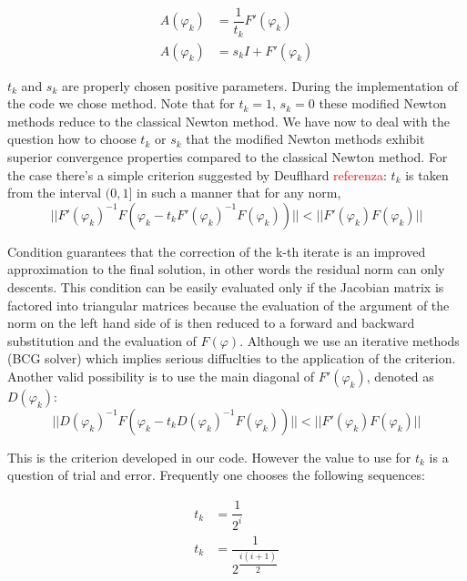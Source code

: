 \begin{align}
A(\varphi_k)&=\dfrac{1}{t_k}F'(\varphi_k) \label{eq: NLP mod used} \\
A(\varphi_k)&=s_kI+F'(\varphi_k) \label{eq: NLP mod not used}
\end{align}

$t_k$ and $s_k$ are properly chosen positive parameters. During the implementation of the code we chose  method. Note that for $t_k=1$, $s_k=0$ these modified Newton methods reduce to the classical Newton method. We have now to deal with the question how to choose $t_k$ or $s_k$ that the modified Newton methods exhibit superior convergence properties compared to the classical Newton method.
For the case  there's a simple criterion suggested by Deuflhard \textcolor{red}{referenza}: $t_k$ is taken from the interval $(0,1]$ in such a manner that for any norm,
\begin{equation}
\label{eq: extended criterion}
||F'(\varphi_k)^{-1}F(\varphi_k-t_kF'(\varphi_k)^{-1}F(\varphi_k))||<||F'(\varphi_k)F(\varphi_k)||
\end{equation}

Condition  guarantees that the correction of the k-th iterate is an improved approximation to the final solution, in other words the residual norm can only descents.
This condition can be easily evaluated only if the Jacobian matrix is factored into triangular matrices because the evaluation of the argument of the norm on the left hand side of  is then reduced to a forward and backward substitution and the evaluation of $F(\varphi)$. Although we use an iterative methods (BCG solver) which implies serious diffuclties to the application of the criterion. Another valid possibility is to use the main diagonal of $F'(\varphi_k)$, denoted as $D(\varphi_k)$:
\begin{equation}
\label{eq: easy criterion}
||D(\varphi_k)^{-1}F(\varphi_k-t_kD(\varphi_k)^{-1}F(\varphi_k))||<||F'(\varphi_k)F(\varphi_k)||
\end{equation}

This is the criterion developed in our code. However the value to use for $t_k$ is a question of trial and error. Frequently one chooses the following sequences:

\begin{align}
t_k & = \dfrac{1}{2^i} \\
t_k & = \dfrac{1}{2^{\dfrac{i(i+1)}{2}}}  
\end{align}


